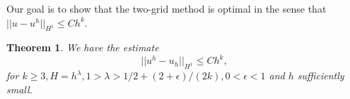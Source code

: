 \documentclass[12pt]{amsart}
\numberwithin{equation}{section}
\newtheorem{thm}{Theorem}[section]
\begin{document}
Our goal is to show that the two-grid method is optimal in the sense that $||u-u^h||_{H^{1}} \leq C h^k$. %
\begin{thm}
We have the estimate
\begin{equation}\label{2grid-conv-lemma}
||u^h-u_h||_{H^{1}} \leq C h^k,
\end{equation}
for $k \geq 3, H=h^{\lambda}, 1> \lambda>  1/2 + (2+\epsilon)/(2k), 0< \epsilon <1$ and $h$ sufficiently small.
\end{thm}
\end{document}
